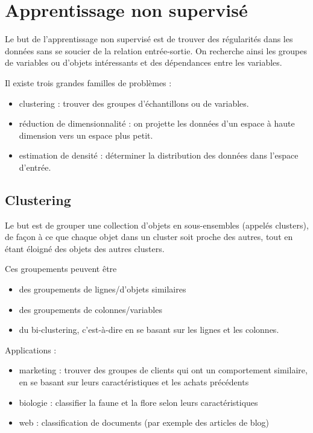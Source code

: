 \chapter{Apprentissage non supervisé}

Le but de l'apprentissage non supervisé est de trouver des régularités dans les données sans se soucier de la relation entrée-sortie. On recherche ainsi les groupes de variables ou d'objets intéressants et des dépendances entre les variables.

Il existe trois grandes familles de problèmes :

\begin{itemize}
	\item clustering : trouver des groupes d'échantillons ou de variables.
	\item réduction de dimensionnalité : on projette les données d'un espace à haute dimension vers un espace plus petit.
	\item estimation de densité : déterminer la distribution des données dans l'espace d'entrée.
\end{itemize}

\section{Clustering}

Le but est de grouper une collection d'objets en sous-ensembles (appelés clusters), de façon à ce que chaque objet dans un cluster soit proche des autres, tout en étant éloigné des objets des autres clusters.
	
Ces groupements peuvent être

\begin{itemize}
	\item des groupements de lignes/d'objets similaires
	\item des groupements de colonnes/variables
	\item du bi-clustering, c'est-à-dire en se basant sur les lignes et les colonnes.
\end{itemize}


Applications :

\begin{itemize}
	\item marketing : trouver des groupes de clients qui ont un comportement similaire, en se basant sur leurs caractéristiques et les achats précédents
	\item biologie : classifier la faune et la flore selon leurs caractéristiques
	\item web : classification de documents (par exemple des articles de blog)
\end{itemize}

